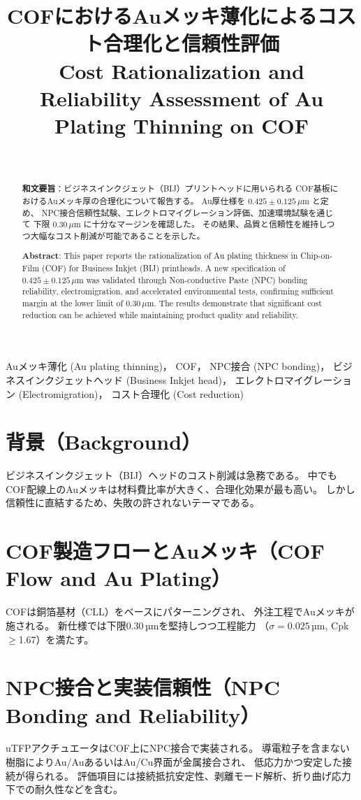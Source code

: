 \documentclass[conference]{IEEEtran}
\title{COFにおけるAuメッキ薄化によるコスト合理化と信頼性評価\\
\large Cost Rationalization and Reliability Assessment of Au Plating Thinning on COF}
\author{%
  \IEEEauthorblockN{三溝 真一（Shinichi Samizo)}\\
  \IEEEauthorblockA{独立系半導体研究者（元セイコーエプソン）\\
  Email: \href{mailto:shin3t72@gmail.com}{shin3t72@gmail.com}\\
  GitHub: \url{https://github.com/Samizo-AITL}}%
}
\begin{document}
\maketitle

\begin{abstract}
\textbf{和文要旨}：ビジネスインクジェット（BIJ）プリントヘッドに用いられる
COF基板におけるAuメッキ厚の合理化について報告する。
Au厚仕様を $0.425 \pm 0.125\,\mu$m と定め、
NPC接合信頼性試験、エレクトロマイグレーション評価、加速環境試験を通じて
下限 $0.30\,\mu$m に十分なマージンを確認した。
その結果、品質と信頼性を維持しつつ大幅なコスト削減が可能であることを示した。

\medskip
\textbf{Abstract}: This paper reports the rationalization of Au plating thickness
in Chip-on-Film (COF) for Business Inkjet (BIJ) printheads.
A new specification of $0.425 \pm 0.125\,\mu$m was validated
through Non-conductive Paste (NPC) bonding reliability, electromigration,
and accelerated environmental tests, confirming sufficient margin at the lower limit of $0.30\,\mu$m.
The results demonstrate that significant cost reduction can be achieved
while maintaining product quality and reliability.
\end{abstract}

\begin{IEEEkeywords}
Auメッキ薄化 (Au plating thinning)，
COF，
NPC接合 (NPC bonding)，
ビジネスインクジェットヘッド (Business Inkjet head)，
エレクトロマイグレーション (Electromigration)，
コスト合理化 (Cost reduction)
\end{IEEEkeywords}

\section{背景（Background）}
ビジネスインクジェット（BIJ）ヘッドのコスト削減は急務である。
中でもCOF配線上のAuメッキは材料費比率が大きく、合理化効果が最も高い。
しかし信頼性に直結するため、失敗の許されないテーマである。

\section{COF製造フローとAuメッキ（COF Flow and Au Plating）}
COFは銅箔基材（CLL）をベースにパターニングされ、
外注工程でAuメッキが施される。
新仕様では下限0.30\,µmを堅持しつつ工程能力
（$\sigma=0.025$\,µm, Cpk$\geq$1.67）を満たす。

\section{NPC接合と実装信頼性（NPC Bonding and Reliability）}
uTFPアクチュエータはCOF上にNPC接合で実装される。
導電粒子を含まない樹脂によりAu/AuあるいはAu/Cu界面が金属接合され、
低応力かつ安定した接続が得られる。
評価項目には接続抵抗安定性、剥離モード解析、折り曲げ応力下での耐久性などを含む。
\end{document}
